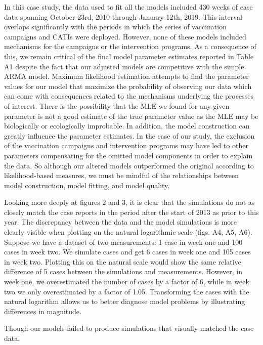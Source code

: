 \documentclass[12pt]{article}
\begin{document}
   In this case study, the data used to fit all the models included 430 weeks of case data spanning October 23rd, 2010 through January 12th, 2019. This interval overlaps significantly with the periods in which the series of vaccination campaigns and CATIs were deployed. However, none of these models included mechanisms for the campaigns or the intervention programs. As a consequence of this, we remain critical of the final model parameter estimates reported in Table A1 despite the fact that our adjusted models are competitive with the simple ARMA model. Maximum likelihood estimation attempts to find the parameter values for our model that maximize the probability of observing our data which can come with consequences related to the mechanisms underlying the processes of interest. There is the possibility that the MLE we found for any given parameter is not a good estimate of the true parameter value as the MLE may be biologically or ecologically improbable. In addition, the model construction can greatly influence the parameter estimates. In the case of our study, the exclusion of the vaccination campaigns and intervention programs may have led to other parameters compensating for the omitted model components in order to explain the data. So although our altered models outperformed the original according to likelihood\hyp{}based measures, we must be mindful of the relationships between model construction, model fitting, and model quality.
   
   Looking more deeply at figures 2 and 3, it is clear that the simulations do not as closely match the case reports in the period after the start of 2013 as prior to this year. The discrepancy between the data and the model simulations is more clearly visible when plotting on the natural logarithmic scale (figs. A4, A5, A6). Suppose we have a dataset of two measurements: 1 case in week one and 100 cases in week two. We simulate cases and get 6 cases in week one and 105 cases in week two. Plotting this on the natural scale would show the same relative difference of 5 cases between the simulations and measurements. However, in week one, we overestimated the number of cases by a factor of 6, while in week two we only overestimated by a factor of 1.05. Transforming the cases with the natural logarithm allows us to better diagnose model problems by illustrating differences in magnitude. 
   
   Though our models failed to produce simulations that visually matched the case data. 
   
\end{document}
